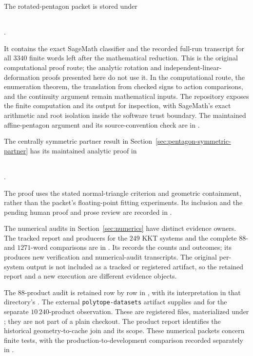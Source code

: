 The rotated-pentagon packet is stored under
\begin{center}
  \small{}\\[-0.2em]
  .
\end{center}
It contains the exact SageMath classifier and the recorded full-run transcript
for all \(3340\) finite words left after the mathematical reduction.  This is the original computational proof route; the analytic rotation and
independent-linear-deformation proofs presented here do not use it. In the
computational route, the enumeration theorem, the
translation from checked signs to action comparisons, and the continuity
argument remain mathematical inputs.  The repository exposes the finite
computation and its output for inspection, with SageMath's exact arithmetic
and root isolation inside the software trust boundary. The maintained
affine-pentagon argument and its source-convention check are in
.

The centrally symmetric partner result in
Section~\ref{sec:pentagon-symmetric-partner} has its maintained analytic proof in
\begin{center}
  \small{}\\[-0.2em]
  .
\end{center}
The proof uses the stated normal-triangle criterion and geometric containment,
rather than the packet's floating-point fitting experiments. Its inclusion
and the pending human proof and prose review are recorded in
.

The numerical audits in Section~\ref{sec:numerics} have distinct evidence owners.
The tracked report and producers for the \(249\) KKT systems and the complete
\(88\)- and \(1271\)-word comparisons are in
.
Its  records the counts and outcomes; its 
produces new verification and numerical-audit transcripts. The original
per-system output is not included as a tracked or registered artifact, so
the retained report and a new execution are different evidence objects.

\begin{sloppypar}
The \(88\)-product audit is retained row by row in
,
with its interpretation in that directory's .
The external \texttt{polytope-datasets} artifact supplies
 and  for the separate
\(10\,240\)-product observation. These are registered files,
materialized under ; they are not part
of a plain checkout. The product report identifies the historical
geometry-to-cache join and its scope. These numerical packets concern finite
tests, with the production-to-development comparison recorded separately in
.
\end{sloppypar}

